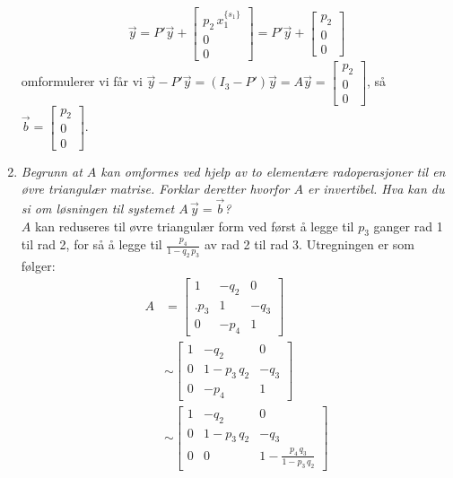 \documentclass{article}[norsk]
\begin{document}
\begin{enumerate}[label=\alph*)]
\begin{equation*}
	\vec{y}=P'\vec{y} + \begin{bmatrix}
    	p_{2} \, x_1^{\{s_1\}}\\
        0\\
        0
    \end{bmatrix} = P'\vec{y} + \begin{bmatrix}
    	p_{2}\\
        0\\
        0
    \end{bmatrix}
\end{equation*}
 omformulerer vi får vi $\displaystyle \vec{y} - P'\vec{y} = (I_3 - P')\vec{y} = A\vec{y} = \begin{bmatrix}
 	p_2\\0\\0
\end{bmatrix}$, så $\vec{b} = \begin{bmatrix}p_2\\0\\0 \end{bmatrix}$.
	\item \textit{Begrunn at $A$ kan omformes ved hjelp av to elementære radoperasjoner til en øvre triangulær matrise. Forklar deretter hvorfor $A$ er invertibel. Hva kan du si om løsningen til systemet $A\,\vec{y}=\vec{b}$?}\\ 
    
    $A$ kan reduseres til øvre triangulær form ved først å legge til $p_3$ ganger rad 1 til rad 2, for så å legge til $\frac{p_4}{1 - q_2 \, p_3}$ av rad 2 til rad 3. Utregningen er som følger:
\begin{equation*} \begin{aligned}
A &=
	\begin{bmatrix}
    	1	&-q_2	&0\\
       .p_3	&1	&-q_3\\
        0	&-p_4	&1
    \end{bmatrix}\\
	&\sim
	\begin{bmatrix}
    	1	&-q_2	&0\\
        0	&1-p_3 \, q_2	&-q_3\\
       0	&-p_4	&1
    \end{bmatrix}\\
    &\sim
	\begin{bmatrix}
    	1	&-q_2	&0\\
        0	&1-p_3 \, q_2	&-q_3\\
        0	&0	&1 - \frac{p_4\,q_3}{1 - p_3 \, q_2}
    \end{bmatrix}
\end{aligned} \end{equation*}



\end{enumerate}
\end{document}
